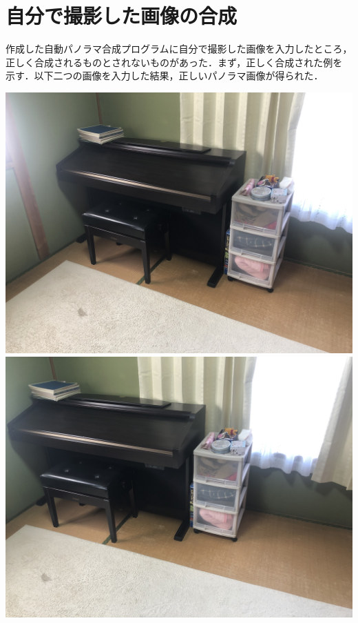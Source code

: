 \documentclass[11pt]{jarticle}
\begin{document}
\section{自分で撮影した画像の合成}

作成した自動パノラマ合成プログラムに自分で撮影した画像を入力したところ，
正しく合成されるものとされないものがあった．まず，正しく合成された例を
示す．以下二つの画像を入力した結果，正しいパノラマ画像が得られた．


\includegraphics[scale=.055]{./img/piano0.jpg}
\includegraphics[scale=.055]{./img/piano1.jpg}
\end{document}
